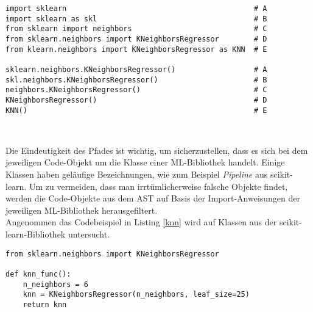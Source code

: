 \documentclass[german,bachelor]{swsLeipzig}
\begin{document}
\noindent\begin{minipage}{\linewidth}
\begin{lstlisting}[language=iPython, frame=single, label=import,  basicstyle=\small, caption={Import- und Verwendungsmöglichkeiten der KNeighborsRegressor-Klasse aus scikit-learn},captionpos=b]
import sklearn                                           # A
import sklearn as skl                                    # B
from sklearn import neighbors                            # C
from sklearn.neighbors import KNeighborsRegressor        # D
from klearn.neighbors import KNeighborsRegressor as KNN  # E

sklearn.neighbors.KNeighborsRegressor()                  # A
skl.neighbors.KNeighborsRegressor()                      # B
neighbors.KNeighborsRegressor()                          # C
KNeighborsRegressor()                                    # D
KNN()                                                    # E
\end{lstlisting}
\end{minipage}
\

\noindent Die Eindeutigkeit des Pfades ist wichtig, um sicherzustellen, dass es sich bei dem jeweiligen Code-Objekt um die Klasse
einer ML-Bibliothek handelt.
Einige Klassen haben geläufige Bezeichnungen, wie zum Beispiel \textit{Pipeline} aus scikit-learn.
Um zu vermeiden, dass man irrtümlicherweise falsche Objekte findet, werden die Code-Objekte aus dem AST auf Basis der
Import-Anweisungen der jeweiligen ML-Bibliothek herausgefiltert.\\
\indent Angenommen das Codebeispiel in Listing \ref{knn} wird auf Klassen aus der scikit-learn-Bibliothek untersucht.\\

\noindent\begin{minipage}{\linewidth}
\begin{lstlisting}[language=iPython, frame=single, label=knn,  basicstyle=\small, caption={Codebeispiel mit KNeighborsRegressor-Klasse},captionpos=b]
from sklearn.neighbors import KNeighborsRegressor

def knn_func():
    n_neighbors = 6
    knn = KNeighborsRegressor(n_neighbors, leaf_size=25)
    return knn
\end{lstlisting}
\end{minipage}
\
\end{document}
